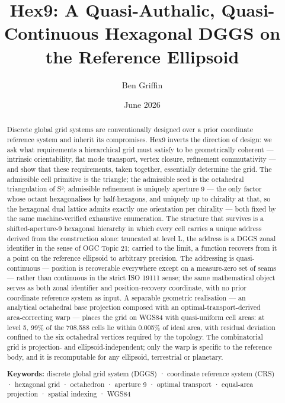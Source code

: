 \documentclass[
  11pt,
  a4paper,
]{article}
\title{Hex9: A Quasi-Authalic, Quasi-Continuous Hexagonal DGGS on the
Reference Ellipsoid}
\author{Ben Griffin}
\date{June 2026}
\begin{document}
\maketitle
\begin{abstract}
Discrete global grid systems are conventionally designed over a prior
coordinate reference system and inherit its compromises. Hex9 inverts
the direction of design: we ask what requirements a hierarchical grid
must satisfy to be geometrically coherent --- intrinsic orientability,
flat mode transport, vertex closure, refinement commutativity --- and
show that these requirements, taken together, essentially determine the
grid. The admissible cell primitive is the triangle; the admissible seed
is the octahedral triangulation of S²; admissible refinement is uniquely
aperture 9 --- the only factor whose octant hexagonalises by
half-hexagons, and uniquely up to chirality at that, so the hexagonal
dual lattice admits exactly one orientation per chirality --- both fixed
by the same machine-verified exhaustive enumeration. The structure that
survives is a shifted-aperture-9 hexagonal hierarchy in which every cell
carries a unique address derived from the construction alone: truncated
at level L, the address is a DGGS zonal identifier in the sense of OGC
Topic 21; carried to the limit, a function recovers from it a point on
the reference ellipsoid to arbitrary precision. The addressing is
quasi-continuous --- position is recoverable everywhere except on a
measure-zero set of seams --- rather than continuous in the strict ISO
19111 sense; the same mathematical object serves as both zonal
identifier and position-recovery coordinate, with no prior coordinate
reference system as input. A separable geometric realisation --- an
analytical octahedral base projection composed with an
optimal-transport-derived area-correcting warp --- places the grid on
WGS84 with quasi-uniform cell areas: at level 5, 99\% of the 708,588
cells lie within 0.005\% of ideal area, with residual deviation confined
to the six octahedral vertices required by the topology. The
combinatorial grid is projection- and ellipsoid-independent; only the
warp is specific to the reference body, and it is recomputable for any
ellipsoid, terrestrial or planetary.

\textbf{Keywords:} discrete global grid system (DGGS) · coordinate
reference system (CRS) · hexagonal grid · octahedron · aperture 9 ·
optimal transport · equal-area projection · spatial indexing · WGS84
\end{abstract}
\end{document}
